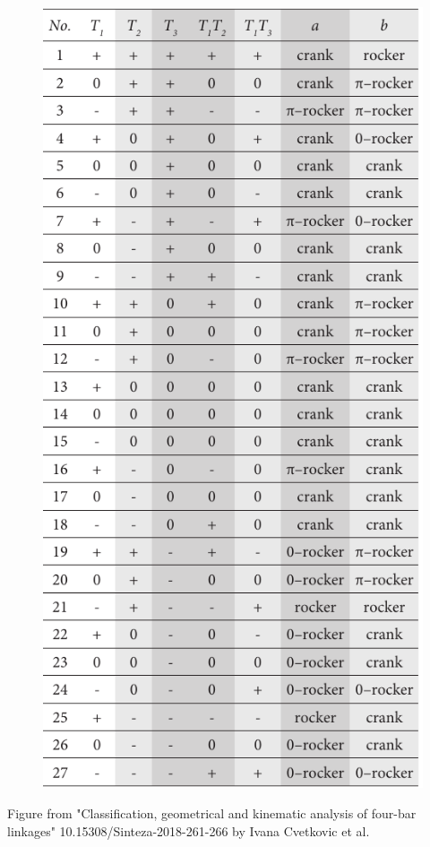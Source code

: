 \documentclass[ucs,10pt]{beamer}
\begin{document}
\begin{frame}
\begin{minipage}{\linewidth}
\begin{minipage}{0.32\linewidth}
\begin{figure}[h]
				\includegraphics[width=\textwidth]{./motion_classification.pdf}
			\end{figure}
		\end{minipage}
	\end{minipage}
	{\tiny Figure from "Classification, geometrical and kinematic analysis of four-bar linkages" 10.15308/Sinteza-2018-261-266 by Ivana Cvetkovic et al.}
\end{frame}
\end{document}
